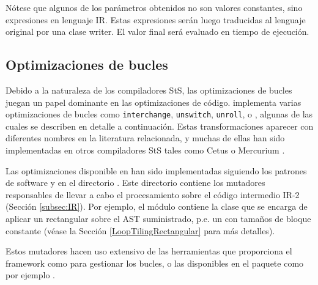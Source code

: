 
Nótese que algunos de los parámetros obtenidos no son valores constantes, sino expresiones en lenguaje \ac{IR}.
Estas expresiones serán luego traducidas al lenguaje original por una clase \ac{writer}.
El valor final será evaluado en tiempo de ejecución.

\subsection{Optimizaciones de bucles}
\label{subsec:loopopt}

\noindent
Debido a la naturaleza de los compiladores \ac{StS}, las optimizaciones de bucles juegan un papel dominante en 
las optimizaciones de código. \yacf{} implementa varias optimizaciones de bucles como \texttt{interchange}, 
\texttt{unswitch}, \texttt{unroll}, o \tiling{}, algunas de las cuales se describen en detalle a continuación.
Estas transformaciones aparecer con diferentes nombres en la literatura relacionada,
y muchas de ellas han sido implementadas en otros compiladores \ac{StS} tales como Cetus 
\cite{Lee:2003:CEC} o Mercurium \cite{URL::Mercurium}.

Las optimizaciones disponible en \yacf{} han sido implementadas siguiendo
los patrones de software  y  \cite{Gamma:1994:DPE}
en el directorio .
Este directorio contiene los mutadores responsables de llevar a cabo el procesamiento sobre el
código intermedio IR-2 (Sección \ref{subsec:IR}).
Por ejemplo, el módulo  contiene la clase 
que se encarga de aplicar un \tiling{} rectangular sobre el \ac{AST} suministrado,
p.e. un \tiling{} con tamaños de bloque constante (véase la Sección \ref{LoopTilingRectangular} para más detalles).

Estos mutadores hacen uso extensivo de las herramientas que proporciona el framework \yacf{} como 
 para gestionar los bucles, o las disponibles en el paquete 
 como por ejemplo .

